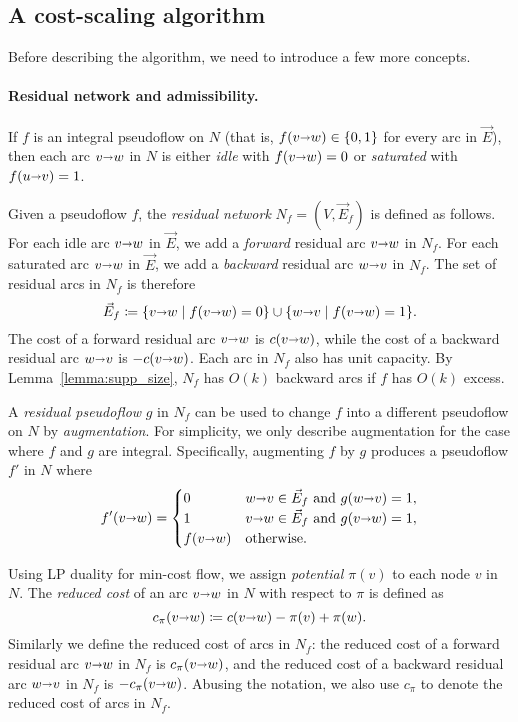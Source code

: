 \documentclass[11pt,twoside]{article}
\makeatletter
\def\arcto{\mathord\shortrightarrow}
\def\arc#1#2{#1\arcto#2}
\theoremstyle{plain}
\numberwithin{figure}{section}
\renewcommand{\subparagraph}{\paragraph}
\def\EMPH#1{\textcolor{BrickRed}{{\emph{#1}}}}
\def\n@te#1{\textsf{\boldmath \textbf{$\langle\!\langle$#1$\rangle\!\rangle$}}\leavevmode}
\def\note#1{\textcolor{red}{\n@te{#1}}}
\makeatother
\begin{document}
\subsection{A cost-scaling algorithm}
\label{SS:cost-scale}

Before describing the algorithm, we need to introduce a few more concepts.

\subparagraph{Residual network and admissibility.}
If $f$ is an integral pseudoflow on $N$
(that is, $f(\arc{v}{w}) \in \{0, 1\}$ for every arc in $\vec{E}$), then each arc
$\arc{v}{w}$ in $N$ is either \EMPH{idle} with $f(\arc{v}{w}) = 0$ or
\EMPH{saturated} with $f(\arc{u}{v}) = 1$.

Given a pseudoflow $f$, the \EMPH{residual network} $N_f = (V, \vec{E}_f)$ is
defined as follows.
For each idle arc $\arc{v}{w}$ in $\vec{E}$, we add a \EMPH{forward} residual
arc $\arc{v}{w}$ in $N_f$.
For each saturated arc $\arc{v}{w}$ in $\vec{E}$, we add a \EMPH{backward}
residual arc $\arc{w}{v}$ in $N_f$.
The set of residual arcs in $N_f$ is therefore
\[
\vec{E}_f \coloneqq \{\arc{v}{w} \mid f(\arc{v}{w}) = 0\} \cup \{\arc{w}{v} \mid f(\arc{v}{w}) = 1\}.
\]
The cost of a forward residual arc $\arc{v}{w}$ is $c(\arc{v}{w})$,
while the cost of a backward residual arc $\arc{w}{v}$ is $-c(\arc{v}{w})$.
Each arc in $N_f$ also has unit capacity.
By Lemma~\ref{lemma:supp_size}, $N_f$ has $O(k)$ backward arcs if $f$ has $O(k)$ excess.

A \EMPH{residual pseudoflow} $g$ in $N_f$ can be used to change $f$ into a
different pseudoflow on $N$ by \EMPH{augmentation}.
For simplicity, we only describe augmentation for the case where $f$ and $g$ are integral.
Specifically, augmenting $f$ by $g$ produces a pseudoflow $f'$ in $N$ where
\[
f'(\arc vw) = \begin{cases}
	0 & {\arc wv} \in \vec{E}_f \text{ and } g(\arc wv) = 1, \\
	1 & {\arc vw} \in \vec{E}_f \text{ and } g(\arc vw) = 1, \\
	f(\arc vw) & \text{otherwise.}
\end{cases}
\]

Using LP duality for min-cost flow, we assign \EMPH{potential $\pi(v)$} to each node $v$ in $N$.
The \EMPH{reduced cost} of an arc $\arc{v}{w}$ in $N$ with respect to $\pi$ is
defined as
\[
c_\pi(\arc vw) \coloneqq c(\arc vw) - \pi(v) + \pi(w).
\]
Similarly we define the reduced cost of arcs in $N_f$: the reduced cost of a
forward residual arc $\arc vw$ in $N_f$ is $c_\pi(\arc vw)$, and the reduced cost of a
backward residual arc $\arc wv$ in $N_f$ is $-c_\pi(\arc vw)$.
Abusing the notation, we also use $c_\pi$ to denote the reduced cost of arcs in
$N_f$.
\end{document}
